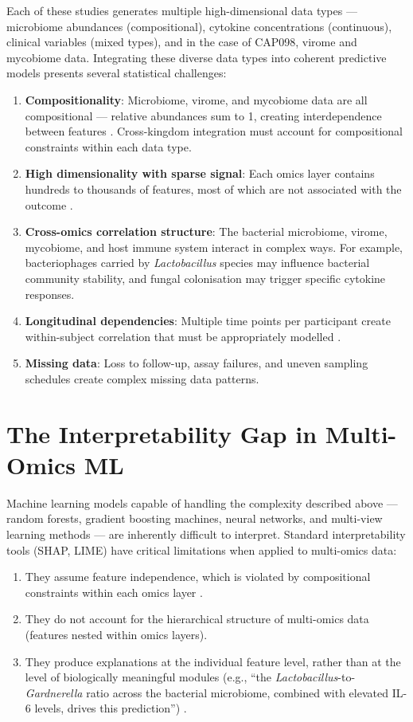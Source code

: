 \documentclass[12pt,a4paper]{report}
\begin{document}
Each of these studies generates multiple high-dimensional data types --- microbiome abundances (compositional), cytokine concentrations (continuous), clinical variables (mixed types), and in the case of CAP098, virome and mycobiome data. Integrating these diverse data types into coherent predictive models presents several statistical challenges:

\begin{enumerate}
    \item \textbf{Compositionality}: Microbiome, virome, and mycobiome data are all compositional --- relative abundances sum to 1, creating interdependence between features \cite{aitchison1982statistical, gloor2017microbiome}. Cross-kingdom integration must account for compositional constraints within each data type.
    \item \textbf{High dimensionality with sparse signal}: Each omics layer contains hundreds to thousands of features, most of which are not associated with the outcome \cite{topcuoglu2021}.
    \item \textbf{Cross-omics correlation structure}: The bacterial microbiome, virome, mycobiome, and host immune system interact in complex ways. For example, bacteriophages carried by \textit{Lactobacillus} species may influence bacterial community stability, and fungal colonisation may trigger specific cytokine responses.
    \item \textbf{Longitudinal dependencies}: Multiple time points per participant create within-subject correlation that must be appropriately modelled \cite{diggle2002}.
    \item \textbf{Missing data}: Loss to follow-up, assay failures, and uneven sampling schedules create complex missing data patterns.
\end{enumerate}

\section{The Interpretability Gap in Multi-Omics ML}

Machine learning models capable of handling the complexity described above --- random forests, gradient boosting machines, neural networks, and multi-view learning methods --- are inherently difficult to interpret. Standard interpretability tools (SHAP, LIME) have critical limitations when applied to multi-omics data:

\begin{enumerate}
    \item They assume feature independence, which is violated by compositional constraints within each omics layer \cite{lundberg2017unified}.
    \item They do not account for the hierarchical structure of multi-omics data (features nested within omics layers).
    \item They produce explanations at the individual feature level, rather than at the level of biologically meaningful modules (e.g., ``the \textit{Lactobacillus}-to-\textit{Gardnerella} ratio across the bacterial microbiome, combined with elevated IL-6 levels, drives this prediction'') \cite{fryer2021shapley}.
\end{enumerate}
\end{document}
